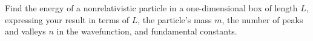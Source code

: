 Find the energy of a nonrelativistic particle in a one-dimensional box of
length $L$, expressing your result in terms of $L$, the
particle's mass $m$, the number of peaks and valleys $n$ in
the wavefunction, and fundamental constants.\answercheck
